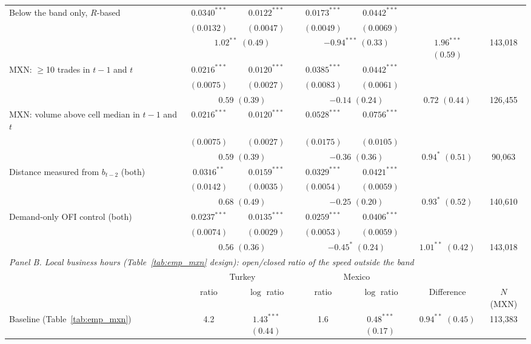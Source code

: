 \begin{tabular}{lcccccc}
Below the band only, $R$-based & $0.0340^{***}$ & $0.0122^{***}$ & $0.0173^{***}$ & $0.0442^{***}$ & & \\
 & $(0.0132)$ & $(0.0047)$ & $(0.0049)$ & $(0.0069)$ & & \\
 & \multicolumn{2}{c}{$1.02^{**}$ $(0.49)$} & \multicolumn{2}{c}{$-0.94^{***}$ $(0.33)$} & $1.96^{***}$ $(0.59)$ & 143,018 \\[2pt]
MXN: $\geq$10 trades in $t-1$ and $t$ & $0.0216^{***}$ & $0.0120^{***}$ & $0.0385^{***}$ & $0.0442^{***}$ & & \\
 & $(0.0075)$ & $(0.0027)$ & $(0.0083)$ & $(0.0061)$ & & \\
 & \multicolumn{2}{c}{$0.59$ $(0.39)$} & \multicolumn{2}{c}{$-0.14$ $(0.24)$} & $0.72$ $(0.44)$ & 126,455 \\[2pt]
MXN: volume above cell median in $t-1$ and $t$ & $0.0216^{***}$ & $0.0120^{***}$ & $0.0528^{***}$ & $0.0756^{***}$ & & \\
 & $(0.0075)$ & $(0.0027)$ & $(0.0175)$ & $(0.0105)$ & & \\
 & \multicolumn{2}{c}{$0.59$ $(0.39)$} & \multicolumn{2}{c}{$-0.36$ $(0.36)$} & $0.94^{*}$ $(0.51)$ & 90,063 \\[2pt]
Distance measured from $b_{t-2}$ (both) & $0.0316^{**}$ & $0.0159^{***}$ & $0.0329^{***}$ & $0.0421^{***}$ & & \\
 & $(0.0142)$ & $(0.0035)$ & $(0.0054)$ & $(0.0059)$ & & \\
 & \multicolumn{2}{c}{$0.68$ $(0.49)$} & \multicolumn{2}{c}{$-0.25$ $(0.20)$} & $0.93^{*}$ $(0.52)$ & 140,610 \\[2pt]
Demand-only OFI control (both) & $0.0237^{***}$ & $0.0135^{***}$ & $0.0259^{***}$ & $0.0406^{***}$ & & \\
 & $(0.0074)$ & $(0.0029)$ & $(0.0053)$ & $(0.0059)$ & & \\
 & \multicolumn{2}{c}{$0.56$ $(0.36)$} & \multicolumn{2}{c}{$-0.45^{*}$ $(0.24)$} & $1.01^{**}$ $(0.42)$ & 143,018 \\[2pt]
\midrule
\multicolumn{7}{l}{\emph{Panel B. Local business hours (Table~\ref{tab:emp_mxn} design): open/closed ratio of the speed outside the band}} \\
 & \multicolumn{2}{c}{Turkey} & \multicolumn{2}{c}{Mexico} & & \\
\cmidrule(lr){2-3}\cmidrule(lr){4-5}
 & ratio & $\log$ ratio & ratio & $\log$ ratio & Difference & $N$ (MXN) \\
\midrule
Baseline (Table~\ref{tab:emp_mxn}) & 4.2 & $1.43^{***}$ $(0.44)$ & 1.6 & $0.48^{***}$ $(0.17)$ & $0.94^{**}$ $(0.45)$ & 113,383 \\

\end{tabular}
